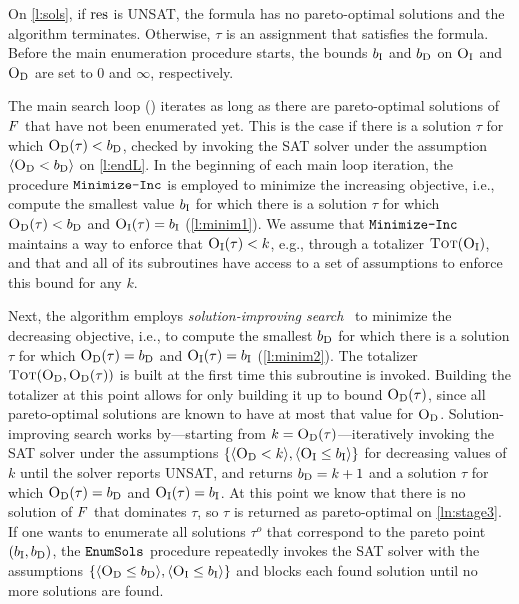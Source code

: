 On \cref{l:sols}, if $\text{res}$ is UNSAT, the formula has no pareto-optimal solutions and the algorithm terminates.
Otherwise, $\tau$ is an assignment that satisfies the formula.
Before the main enumeration procedure starts, the bounds $b_{\text{I}}$ and $b_{\text{D}}$ on $\textsc{O}_{\text{I}}$ and $\textsc{O}_{\text{D}}$ are set to $0$ and $\infty$, respectively.

The main search loop () iterates as long as there are pareto-optimal solutions of $F$ that have not been enumerated yet. 
This is the case if there is a solution $\tau$ for which $\textsc{O}_{\text{D}}(\tau) < b_{\text{D}}$, checked by invoking the SAT solver under the assumption $\langle \textsc{O}_{\text{D}} < b_{\text{D}} \rangle$ on \cref{l:endL}.
In the beginning of each main loop iteration, the procedure $\texttt{Minimize-\allowbreak{}Inc}$ is employed to minimize the increasing objective, i.e., compute the smallest value $b_{\text{I}}$ for which there is a solution $\tau$ for which $\textsc{O}_{\text{D}}(\tau) < b_{\text{D}}$ and $\textsc{O}_{\text{I}}(\tau) = b_{\text{I}}$  (\cref{l:minim1}). 
We assume that $\texttt{Minimize-\allowbreak{}Inc}$ maintains a way to enforce that $\textsc{O}_{\text{I}}(\tau) < k$, e.g., through a totalizer $\textsc{Tot}(\textsc{O}_{\text{I}})$, and that \algname{} and all of its subroutines have access to a set of assumptions to enforce this bound for any $k$.

Next, the algorithm employs \emph{solution-improving search}~\autocite{handbook2-maxsat,DBLP:journals/jsat/BerreP10,DBLP:journals/jsat/EenS06} to minimize the decreasing objective, i.e., to compute the smallest $b_{\text{D}}$ for which there is a solution $\tau$ for which $\textsc{O}_{\text{D}}(\tau) = b_{\text{D}}$ and $\textsc{O}_{\text{I}}(\tau) = b_{\text{I}}$  (\cref{l:minim2}).
The totalizer $\textsc{Tot}(\textsc{O}_{\text{D}}, \textsc{O}_{\text{D}}(\tau))$ is built at the first time this subroutine is invoked.
Building the totalizer at this point allows for only building it up to bound $\textsc{O}_{\text{D}}(\tau)$, since all pareto-optimal solutions are known to have at most that value for $\textsc{O}_{\text{D}}$.
Solution-improving search works by---starting from $k=\textsc{O}_{\text{D}}(\tau)$---iteratively invoking the SAT solver under the assumptions $\{\langle \textsc{O}_{\text{D}} < k \rangle, \langle \textsc{O}_{\text{I}} \leq b_{\text{I}} \rangle\}$ for decreasing values of $k$ until the solver reports UNSAT, and returns $b_{\text{D}}=k+1$ and a solution $\tau$ for which $\textsc{O}_{\text{D}}(\tau) = b_{\text{D}}$ and $\textsc{O}_{\text{I}}(\tau) = b_{\text{I}}$.
At this point we know that there is no solution of $F$ that dominates $\tau$, so $\tau$ is returned as pareto-optimal on \cref{ln:stage3}.
If one wants to enumerate all solutions $\tau^o$ that correspond to the pareto point $(b_{\text{I}},b_{\text{D}})$, the $\texttt{EnumSols}$ procedure repeatedly invokes the SAT solver with the assumptions $\{\langle \textsc{O}_{\text{D}} \leq b_{\text{D}} \rangle , \langle \textsc{O}_{\text{I}} \leq b_{\text{I}} \rangle\}$ and blocks each found solution until no more solutions are found.

